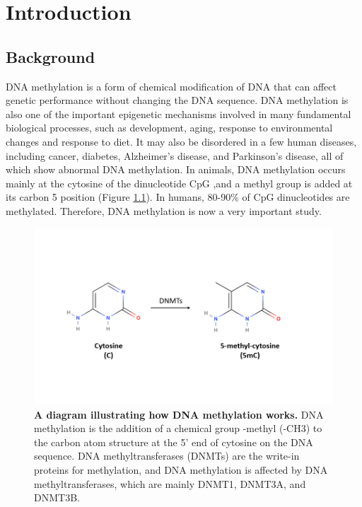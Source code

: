 \documentclass{PHlab-thesis}
\begin{document}
\printnomenclature[5cm]

\newpage
\setcounter{page}{1}



\chapter{Introduction}
\section{Background}
DNA methylation is a form of chemical modification of DNA that can affect genetic performance without changing the DNA sequence\cite{guo2013bs}. DNA methylation is also one of the important epigenetic mechanisms involved in many fundamental biological processes, such as development, aging, response to environmental changes and response to diet. It may also be disordered in a few human diseases, including cancer, diabetes, Alzheimer’s disease, and Parkinson’s disease, all of which show abnormal DNA methylation. In animals, DNA methylation occurs mainly at the cytosine of the dinucleotide CpG ,and a methyl group is added at its carbon 5 position (Figure \ref{f1}). In humans, 80-90\% of CpG dinucleotides are methylated. Therefore, DNA methylation is now a very important study.

\begin{figure}[h!]
  \centering
  \includegraphics[scale=0.8]{figures/dna_methylation.png}
  \caption{\textbf{A diagram illustrating how DNA methylation works.}
  DNA methylation is the addition of a chemical group -methyl (-CH3) to the carbon atom structure at the 5' end of cytosine on the DNA sequence. DNA methyltransferases (DNMTs) are the write-in proteins for methylation, and DNA methylation is affected by DNA methyltransferases, which are mainly DNMT1, DNMT3A, and DNMT3B. }
  \label{f1}
\end{figure}
\end{document}
